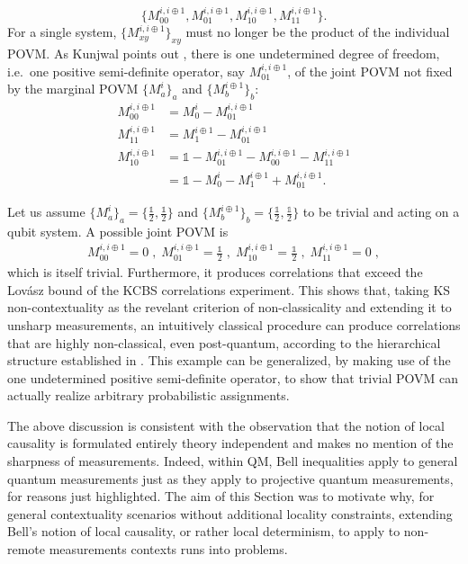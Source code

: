 \begin{itemize}
\begin{equation*}
    \{M_{00}^{i,i\oplus1}, M_{01}^{i,i\oplus1},  M_{10}^{i,i\oplus1}, M_{11}^{i,i\oplus1}\}.
    \end{equation*}
    For a single system, $\{M_{xy}^{i,i\oplus 1}\}_{xy}$ must no longer be the product of the individual POVM. As Kunjwal points out \cite{Kunjwal2019}, there is one undetermined degree of freedom, i.e.\ one positive semi-definite operator, say $M_{01}^{i,i\oplus 1}$, of the joint POVM not fixed by the marginal POVM $\{M_a^i\}_a$ and $\{M_b^{i\oplus 1}\}_b$:
    \begin{align*}
        M_{00}^{i,i\oplus 1}&=M_0^i-M_{01}^{i,i\oplus 1} \\[0.3em]
        M_{11}^{i,i\oplus 1}&=M_1^{i\oplus 1}-M_{01}^{i,i\oplus 1} \\[0.3em] M_{10}^{i,i\oplus 1}&=\mathbb{1}-M_{01}^{i,i\oplus 1}-M_{00}^{i,i\oplus 1}-M_{11}^{i,i\oplus 1} \\[0.3em]
        &=\mathbb{1}-M_0^i-M_1^{i\oplus 1}+M_{01}^{i,i\oplus 1}.
    \end{align*}

Let us assume $\{M_a^i\}_a=\{\frac{\mathbb{1}}{2}, \frac{\mathbb{1}}{2}\}$ and $\{M_b^{i\oplus 1}\}_b=\{\frac{\mathbb{1}}{2}, \frac{\mathbb{1}}{2}\}$ to be trivial and acting on a qubit system. A possible joint POVM is
\begin{align*}
    M_{00}^{i,i\oplus 1}  = 0\;,\;
    M_{01}^{i,i\oplus 1}  = \frac{\mathbb{1}}{2}\;,\;
    M_{10}^{i,i\oplus 1}  = \frac{\mathbb{1}}{2}\;,\;
    M_{11}^{i,i\oplus 1}  = 0 \;,
\end{align*}
which is itself trivial. Furthermore, it produces correlations that exceed the Lovász bound of the KCBS correlations experiment. This shows that, taking KS non-contextuality as the revelant criterion of non-classicality and extending it to unsharp measurements, an intuitively classical procedure can produce correlations that are highly non-classical, even post-quantum, according to the hierarchical structure established in \cite{Cabello2014}. This example can be generalized, by making use of the one undetermined positive semi-definite operator, to show that trivial POVM can actually realize arbitrary probabilistic assignments.

The above discussion is consistent with the observation that the notion of local causality is formulated entirely theory independent and makes no mention of the sharpness of measurements. Indeed, within QM, Bell inequalities apply to general quantum measurements just as they apply to projective quantum measurements, for reasons just highlighted. The aim of this Section was to motivate why, for general contextuality scenarios without additional locality constraints, extending Bell's notion of local causality, or rather local determinism, to apply to non-remote measurements contexts runs into problems. 


\end{itemize}
